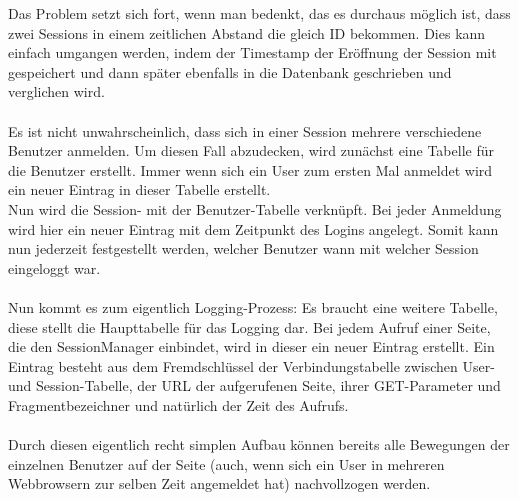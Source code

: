 Das Problem setzt sich fort, wenn man bedenkt, das es durchaus möglich ist, dass zwei Sessions in einem zeitlichen Abstand die gleich ID bekommen. Dies kann einfach umgangen werden, indem der Timestamp der Eröffnung der Session mit gespeichert und dann später ebenfalls in die Datenbank geschrieben und verglichen wird.\\
\\
Es ist nicht unwahrscheinlich, dass sich in einer Session mehrere verschiedene Benutzer anmelden. Um diesen Fall abzudecken, wird zunächst eine Tabelle für die Benutzer erstellt. Immer wenn sich ein User zum ersten Mal anmeldet wird ein neuer Eintrag in dieser Tabelle erstellt.\\
Nun wird die Session- mit der Benutzer-Tabelle verknüpft. Bei jeder Anmeldung wird hier ein neuer Eintrag mit dem Zeitpunkt des Logins angelegt. Somit kann nun jederzeit festgestellt werden, welcher Benutzer wann mit welcher Session eingeloggt war.\\
\\
Nun kommt es zum eigentlich Logging-Prozess: Es braucht eine weitere Tabelle, diese stellt die Haupttabelle für das Logging dar. Bei jedem Aufruf einer Seite, die den SessionManager einbindet, wird in dieser ein neuer Eintrag erstellt. Ein Eintrag besteht aus dem Fremdschlüssel der Verbindungstabelle zwischen User- und Session-Tabelle, der URL der aufgerufenen Seite, ihrer GET-Parameter und Fragmentbezeichner und natürlich der Zeit des Aufrufs.\\
\\
Durch diesen eigentlich recht simplen Aufbau können bereits alle Bewegungen der einzelnen Benutzer auf der Seite (auch, wenn sich ein User in mehreren Webbrowsern zur selben Zeit angemeldet hat) nachvollzogen werden.
\\
 

